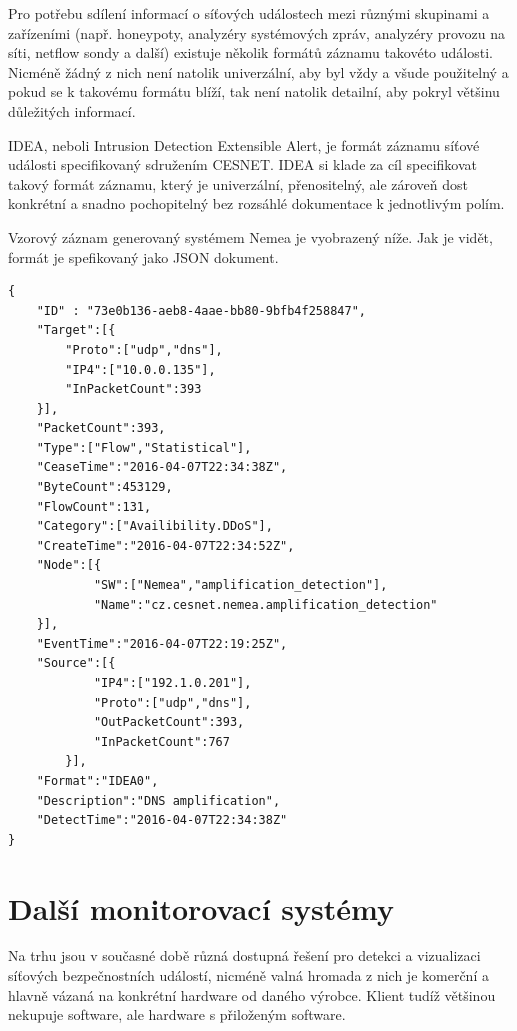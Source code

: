 Pro potřebu sdílení informací o síťových událostech mezi různými skupinami a zařízeními (např. honeypoty, analyzéry systémových zpráv, analyzéry provozu na síti, netflow sondy a další) existuje několik formátů záznamu takovéto události. Nicméně žádný z nich není natolik univerzální, aby byl vždy a všude použitelný a pokud se k takovému formátu blíží, tak není natolik detailní, aby pokryl většinu důležitých informací.

IDEA, neboli Intrusion Detection Extensible Alert, je formát záznamu síťové události specifikovaný sdružením CESNET. IDEA si klade za cíl specifikovat takový formát záznamu, který je univerzální, přenositelný, ale zároveň dost konkrétní a snadno pochopitelný bez rozsáhlé dokumentace k jednotlivým polím.

Vzorový záznam generovaný systémem Nemea je vyobrazený níže. Jak je vidět, formát je spefikovaný jako JSON dokument. 

\begin{verbatim}
{
    "ID" : "73e0b136-aeb8-4aae-bb80-9bfb4f258847",
    "Target":[{
        "Proto":["udp","dns"],
        "IP4":["10.0.0.135"],
        "InPacketCount":393
    }],
    "PacketCount":393,
    "Type":["Flow","Statistical"],
    "CeaseTime":"2016-04-07T22:34:38Z",
    "ByteCount":453129,
    "FlowCount":131,
    "Category":["Availibility.DDoS"],
    "CreateTime":"2016-04-07T22:34:52Z",
    "Node":[{
            "SW":["Nemea","amplification_detection"],
            "Name":"cz.cesnet.nemea.amplification_detection"
    }],
    "EventTime":"2016-04-07T22:19:25Z",
    "Source":[{
            "IP4":["192.1.0.201"],
            "Proto":["udp","dns"],
            "OutPacketCount":393,
            "InPacketCount":767
        }],
    "Format":"IDEA0",
    "Description":"DNS amplification",
    "DetectTime":"2016-04-07T22:34:38Z"
}
\end{verbatim}

\label{Vzorový IDEA záznam z Nemea systému. Některé části byly vynechány nebo zkráceny.}

\section{Další monitorovací systémy}

Na trhu jsou v současné době různá dostupná řešení pro detekci a vizualizaci síťových bezpečnostních událostí, nicméně valná hromada z nich je komerční a hlavně vázaná na konkrétní hardware od daného výrobce. Klient tudíž většinou nekupuje software, ale hardware s přiloženým software. 

